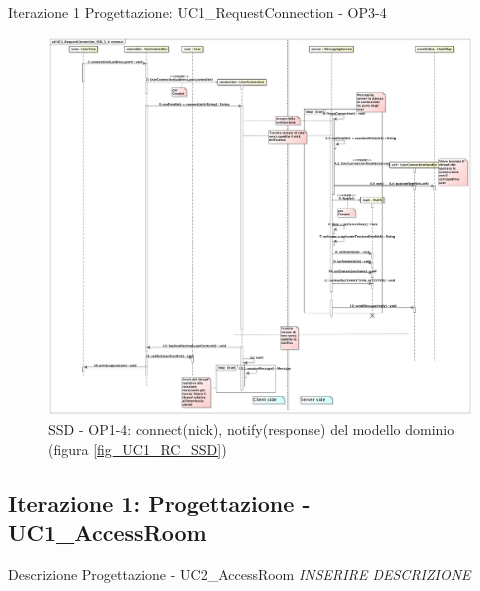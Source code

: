 \documentclass[t]{beamer} %
\begin{document}
\begin{frame} {Iterazione 1 Progettazione: UC1\_RequestConnection - OP3-4}
   \begin{figure}
     \includegraphics[scale=0.069]{image_astah/Iteration_1_DesignModel/UC1_RequestConnection_SSD_3_4_connect.png}{\centering}
     \caption{SSD - OP1-4: connect(nick), notify(response) del modello dominio (figura \ref{fig_UC1_RC_SSD}) }
     \label{fig_UC1_SSD_RC_1_4} 
   \end{figure}
\end{frame}

\subsection{Iterazione 1: Progettazione - UC1\_AccessRoom}
\begin{frame} {Descrizione Progettazione - UC2\_AccessRoom }
 \emph{INSERIRE DESCRIZIONE}
\end{frame}
\end{document}
